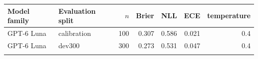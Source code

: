 \begin{tabular}{llrrrrr}
\toprule
Model family & Evaluation split & $n$ & Brier & NLL & ECE & temperature \\
\midrule
GPT-6 Luna & calibration & 100 & 0.307 & 0.586 & 0.021 & 0.4 \\
GPT-6 Luna & dev300 & 300 & 0.273 & 0.531 & 0.047 & 0.4 \\
\addlinespace[2pt]
\bottomrule
\end{tabular}
